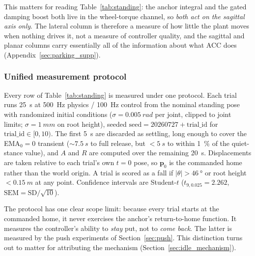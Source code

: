 \documentclass[a4paper,fleqn]{cas-dc}
\begin{document}
This matters for reading Table~\ref{tab:standing}: the anchor integral and the
gated damping boost both live in the wheel-torque channel, so \emph{both act on
the sagittal axis only}. The lateral column is therefore a measure of how little
the plant moves when nothing drives it, not a measure of controller quality, and
the sagittal and planar columns carry essentially all of the information about
what ACC does (Appendix~\ref{sec:parking_supp}).

\subsubsection{Unified measurement protocol}

Every row of Table~\ref{tab:standing} is measured under one protocol.
Each trial runs \SI{25}{s} at \SI{500}{Hz} physics / \SI{100}{Hz} control from the
nominal standing pose with randomized initial conditions
($\sigma{=}\SI{0.005}{rad}$ per joint, clipped to joint limits;
$\sigma{=}\SI{1}{mm}$ on root height), seeded
$\text{seed}{=}20260727{+}\text{trial\_id}$ for $\text{trial\_id}\in[0,10)$.
The first \SI{5}{s} are discarded as settling, long enough to cover the
EMA$_0{=}0$ transient (${\sim}\SI{7.5}{s}$ to full release, but ${<}\SI{5}{s}$ to
within \SI{1}{\percent} of the quiet-stance value), and $A$ and $R$ are computed
over the remaining \SI{20}{s}. Displacements are taken relative to each trial's own
$t{=}0$ pose, so $\mathbf{p}_0$ is the commanded home rather than the world origin.
A trial is scored as a fall if $|\theta|{>}\SI{46}{\degree}$ or root height
${<}\SI{0.15}{m}$ at any point. Confidence intervals are Student-$t$
($t_{9,0.025}{=}2.262$, $\text{SEM}{=}\text{SD}/\sqrt{10}$).

The protocol has one clear scope limit: because every trial starts at the
commanded home, it never exercises the anchor's return-to-home function. It
measures the controller's ability to \emph{stay} put, not to \emph{come back}. The
latter is measured by the push experiments of Section~\ref{sec:push}. This distinction
turns out to matter for attributing the mechanism (Section~\ref{sec:idle_mechanism}).
\end{document}
